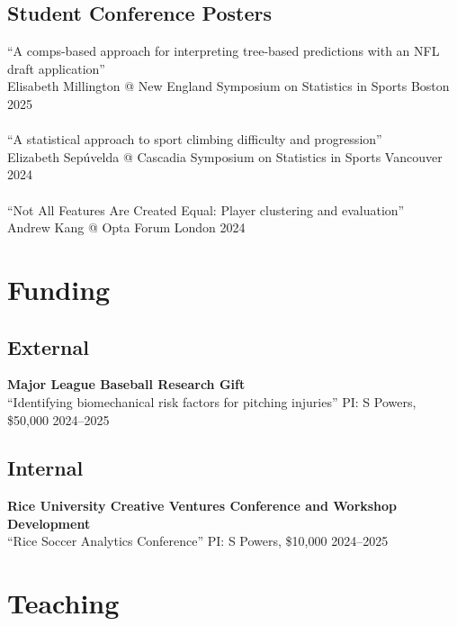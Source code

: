 \documentclass{article}
\begin{document}
\subsection*{\sc Student Conference Posters}

``A comps-based approach for interpreting tree-based predictions with an NFL draft application''\\
Elisabeth Millington @ New England Symposium on Statistics in Sports \hfill Boston 2025\\
~\\
``A statistical approach to sport climbing difficulty and progression''\\
Elizabeth Sep\'uvelda @ Cascadia Symposium on Statistics in Sports \hfill Vancouver 2024\\
~\\
``Not All Features Are Created Equal: Player clustering and evaluation''\\
Andrew Kang @ Opta Forum \hfill London 2024


\section*{\sc Funding}

\subsection*{\sc External}

{\bf Major League Baseball Research Gift}\\
``Identifying biomechanical risk factors for pitching injuries'' PI: S Powers, \$50,000 \hfill 2024--2025

\subsection*{\sc Internal}

{\bf Rice University Creative Ventures Conference and Workshop Development}\\
``Rice Soccer Analytics Conference'' PI: S Powers, \$10,000 \hfill 2024--2025


\section*{\sc Teaching}
\end{document}
